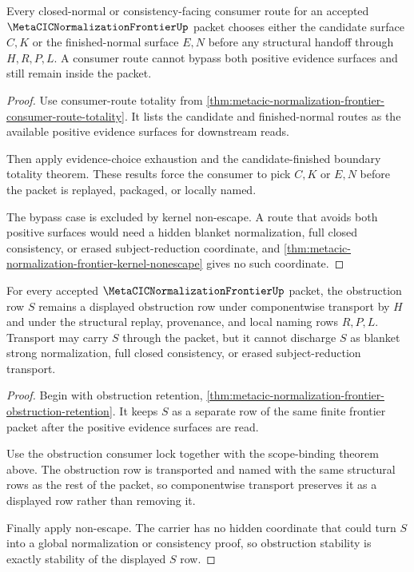 \begin{theorem}
\label{thm:metacic-normalization-frontier-consumer-scope-exhaustion}
Every closed-normal or consistency-facing consumer route for an accepted
$\MetaCICNormalizationFrontierUp$ packet chooses either the candidate surface
$C,K$ or the finished-normal surface $E,N$ before any structural handoff
through $H,R,P,L$. A consumer route cannot bypass both positive evidence
surfaces and still remain inside the packet.
\end{theorem}
\begin{proof}
Use consumer-route totality from
\autoref{thm:metacic-normalization-frontier-consumer-route-totality}. It lists
the candidate and finished-normal routes as the available positive evidence
surfaces for downstream reads.

Then apply evidence-choice exhaustion and the candidate-finished boundary
totality theorem. These results force the consumer to pick $C,K$ or $E,N$
before the packet is replayed, packaged, or locally named.

The bypass case is excluded by kernel non-escape. A route that avoids both
positive surfaces would need a hidden blanket normalization, full closed
consistency, or erased subject-reduction coordinate, and
\autoref{thm:metacic-normalization-frontier-kernel-nonescape} gives no such
coordinate.
\end{proof}

\begin{theorem}
\label{thm:metacic-normalization-frontier-obstruction-scope-stability}
For every accepted $\MetaCICNormalizationFrontierUp$ packet, the obstruction
row $S$ remains a displayed obstruction row under componentwise transport by
$H$ and under the structural replay, provenance, and local naming rows $R,P,L$.
Transport may carry $S$ through the packet, but it cannot discharge $S$ as
blanket strong normalization, full closed consistency, or erased
subject-reduction transport.
\end{theorem}
\begin{proof}
Begin with obstruction retention,
\autoref{thm:metacic-normalization-frontier-obstruction-retention}. It keeps
$S$ as a separate row of the same finite frontier packet after the positive
evidence surfaces are read.

Use the obstruction consumer lock together with the scope-binding theorem
above. The obstruction row is transported and named with the same structural
rows as the rest of the packet, so componentwise transport preserves it as a
displayed row rather than removing it.

Finally apply non-escape. The carrier has no hidden coordinate that could turn
$S$ into a global normalization or consistency proof, so obstruction stability
is exactly stability of the displayed $S$ row.
\end{proof}

